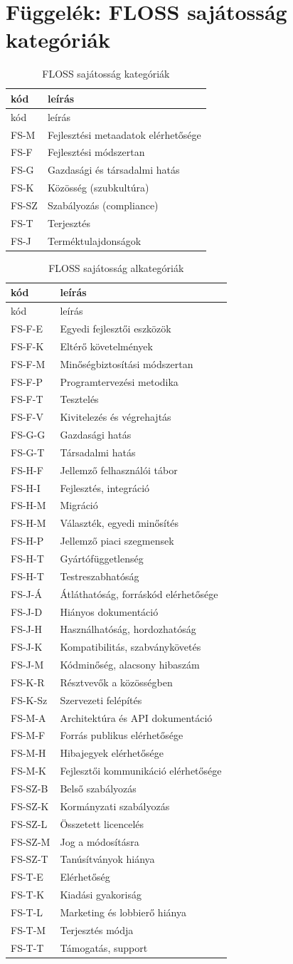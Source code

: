\documentclass[12pt,magyar,a4paper,oneside]{scrreprt}
\begin{document}
\hypertarget{sec:FSK}{%
\chapter{Függelék: FLOSS sajátosság kategóriák}\label{sec:FSK}}

\begin{longtable}[]{@{}ll@{}}
\caption{FLOSS sajátosság kategóriák}\tabularnewline
\toprule
kód & leírás\tabularnewline
\midrule
\endfirsthead
\toprule
kód & leírás\tabularnewline
\midrule
\endhead
FS-M & Fejlesztési metaadatok elérhetősége\tabularnewline
FS-F & Fejlesztési módszertan\tabularnewline
FS-G & Gazdasági és társadalmi hatás\tabularnewline
FS-K & Közösség (szubkultúra)\tabularnewline
FS-SZ & Szabályozás (compliance)\tabularnewline
FS-T & Terjesztés\tabularnewline
FS-J & Terméktulajdonságok\tabularnewline
\bottomrule
\end{longtable}

\begin{longtable}[]{@{}ll@{}}
\caption{FLOSS sajátosság alkategóriák}\tabularnewline
\toprule
kód & leírás\tabularnewline
\midrule
\endfirsthead
\toprule
kód & leírás\tabularnewline
\midrule
\endhead
FS-F-E & Egyedi fejlesztői eszközök\tabularnewline
FS-F-K & Eltérő követelmények\tabularnewline
FS-F-M & Minőségbiztosítási módszertan\tabularnewline
FS-F-P & Programtervezési metodika\tabularnewline
FS-F-T & Tesztelés\tabularnewline
FS-F-V & Kivitelezés és végrehajtás\tabularnewline
FS-G-G & Gazdasági hatás\tabularnewline
FS-G-T & Társadalmi hatás\tabularnewline
FS-H-F & Jellemző felhasználói tábor\tabularnewline
FS-H-I & Fejlesztés, integráció\tabularnewline
FS-H-M & Migráció\tabularnewline
FS-H-M & Választék, egyedi minősítés\tabularnewline
FS-H-P & Jellemző piaci szegmensek\tabularnewline
FS-H-T & Gyártófüggetlenség\tabularnewline
FS-H-T & Testreszabhatóság\tabularnewline
FS-J-Á & Átláthatóság, forráskód elérhetősége\tabularnewline
FS-J-D & Hiányos dokumentáció\tabularnewline
FS-J-H & Használhatóság, hordozhatóság\tabularnewline
FS-J-K & Kompatibilitás, szabványkövetés\tabularnewline
FS-J-M & Kódminőség, alacsony hibaszám\tabularnewline
FS-K-R & Résztvevők a közösségben\tabularnewline
FS-K-Sz & Szervezeti felépítés\tabularnewline
FS-M-A & Architektúra és API dokumentáció\tabularnewline
FS-M-F & Forrás publikus elérhetősége\tabularnewline
FS-M-H & Hibajegyek elérhetősége\tabularnewline
FS-M-K & Fejlesztői kommunikáció elérhetősége\tabularnewline
FS-SZ-B & Belső szabályozás\tabularnewline
FS-SZ-K & Kormányzati szabályozás\tabularnewline
FS-SZ-L & Összetett licencelés\tabularnewline
FS-SZ-M & Jog a módosításra\tabularnewline
FS-SZ-T & Tanúsítványok hiánya\tabularnewline
FS-T-E & Elérhetőség\tabularnewline
FS-T-K & Kiadási gyakoriság\tabularnewline
FS-T-L & Marketing és lobbierő hiánya\tabularnewline
FS-T-M & Terjesztés módja\tabularnewline
FS-T-T & Támogatás, support\tabularnewline
\bottomrule
\end{longtable}
\end{document}

